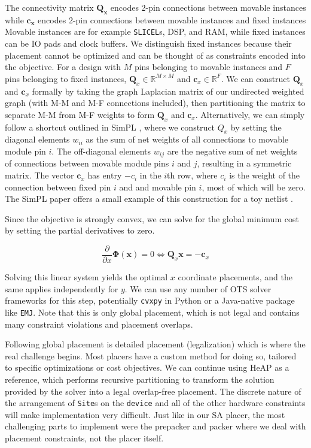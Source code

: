 The connectivity matrix $\boldsymbol{Q_x}$ encodes 2-pin connections between movable instances while $\boldsymbol{c_x}$ encodes 2-pin connections between movable instances and fixed instances   
Movable instances are for example \texttt{SLICEL}s, DSP, and RAM, while fixed instances can be IO pads and clock buffers.
We distinguish fixed instances because their placement cannot be optimized and can be thought of as constraints encoded into the objective.
For a design with $M$ pins belonging to movable instances and $F$ pins belonging to fixed instances, $\boldsymbol{Q}_x \in {\mathbb{R}}^{M \times M}$ and $\boldsymbol{c}_x \in {\mathbb{R}}^F$.
We can construct $\boldsymbol{Q}_x$ and $\boldsymbol{c}_x$ formally by taking the graph Laplacian matrix of our undirected weighted graph (with M-M and M-F connections included), then partitioning the matrix to separate M-M from M-F weights to form $\boldsymbol{Q}_x$ and $\boldsymbol{c}_x$.
Alternatively, we can simply follow a shortcut outlined in SimPL \cite{SimPL}, where we construct $Q_x$ by setting the diagonal elements $w_{ii}$ as the sum of net weights of all connections to movable module pin $i$.
The off-diagonal elements $w_{ij}$ are the negative sum of net weights of connections between movable module pins $i$ and $j$, resulting in a symmetric matrix.
The vector $\boldsymbol{c}_x$ has entry $-c_i$ in the $i$th row, where $c_i$ is the weight of the connection between fixed pin $i$ and and movable pin $i$, most of which will be zero.
The SimPL paper offers a small example of this construction for a toy netlist \cite{SimPL}.

Since the objective is strongly convex, we can solve for the global minimum cost by setting the partial derivatives to zero.

\begin{equation}
    \frac{\partial}{\partial x} \boldsymbol{\Phi} (\boldsymbol{x}) = 0 \Longleftrightarrow \boldsymbol{Q}_x \boldsymbol{x} = - \boldsymbol{c}_x
\end{equation}

Solving this linear system yields the optimal $x$ coordinate placements, and the same applies independently for $y$.
We can use any number of OTS solver frameworks for this step, potentially \texttt{cvxpy} in Python or a Java-native package like \texttt{EMJ}.
Note that this is only global placement, which is not legal and contains many constraint violations and placement overlaps.

Following global placement is detailed placement (legalization) which is where the real challenge begins.
Most placers have a custom method for doing so, tailored to specific optimizations or cost objectives.
We can continue using HeAP as a reference, which performs recursive partitioning to transform the solution provided by the solver into a legal overlap-free placement.
The discrete nature of the arrangement of \texttt{Site}s on the \texttt{device} and all of the other hardware constraints will make implementation very difficult.
Just like in our SA placer, the most challenging parts to implement were the prepacker and packer where we deal with placement constraints, not the placer itself.

